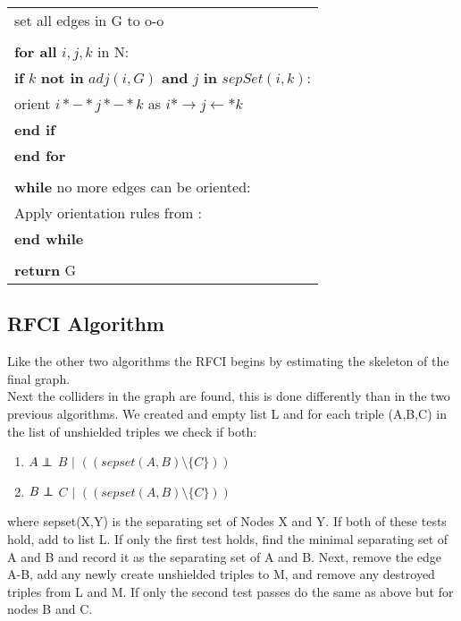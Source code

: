 \documentclass{article}
\newcommand\independent{\protect\mathpalette{\protect\independenT}{\perp}}
\def\independenT#1#2{\mathrel{\rlap{$#1#2$}\mkern2mu{#1#2}}}
\begin{document}
\begin{longtable}{|l l|}
	\multicolumn{2}{|l|}{set all edges in G to o-o}\\
	&\\
	\multicolumn{2}{|l|}{\textbf{for all} $ i,j,k $ in N:}\\
	\multicolumn{2}{|l|}{\quad\textbf{if} $ k $ \textbf{not in} $ adj(i,G) $ \textbf{and} $ j $ \textbf{in} $sepSet( i,k)$:}\\
	\multicolumn{2}{|l|}{\quad\quad orient $ i*-*j*-*k $ as $ i*\rightarrow j \leftarrow *k $ }\\
	\multicolumn{2}{|l|}{\quad\textbf{end if}}\\
	\multicolumn{2}{|l|}{\textbf{end for}}\\
	&\\
	
	\multicolumn{2}{|l|}{\textbf{while} no more edges can be oriented:}\\
	\multicolumn{2}{|l|}{\quad Apply orientation rules from \cite{ZHANG20081873}:}\\
	\multicolumn{2}{|l|}{\textbf{end while}}\\
	&\\
	\multicolumn{2}{|l|}{\textbf{return} G}\\
	\hline 
\end{longtable}

\subsection{RFCI Algorithm}
Like the other two algorithms the RFCI begins by estimating the skeleton of the final graph.
\\

Next the colliders in the graph are found, this is done differently than in the two previous algorithms. We created and empty list L and for each triple (A,B,C) in the list of unshielded triples we check if both:
\\

\begin{enumerate}[i]
	\item $A \independent$ $B$ $|$ $((sepset(A,B) \setminus \{C\}))$
	\item $B \independent$ $C$ $|$ $((sepset(A,B) \setminus \{C\}))$\end{enumerate}
where sepset(X,Y) is the separating set of Nodes X and Y. If both of these tests hold, add to list L. If only the first test holds, find the minimal separating set of A and B and record it as the separating set of A and B. Next, remove the edge A-B, add any newly create unshielded triples to M, and remove any destroyed triples from L and M. If only the second test passes do the same as above but for nodes B and C.
\\
\end{document}
